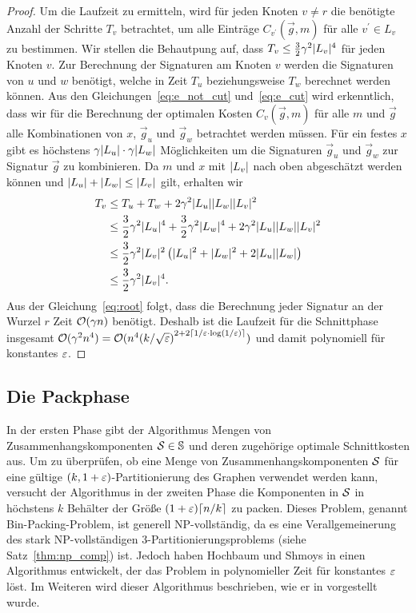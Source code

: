 \begin{proof}
    Um die Laufzeit zu ermitteln, wird für jeden Knoten $v \neq r$ die benötigte Anzahl der Schritte $T_v$ betrachtet, um alle Einträge $C_{v^\prime}(\vec{g}, m)$ für alle $v^\prime \in L_v$ zu bestimmen. 
    Wir stellen die Behautpung auf, dass $T_v \leq \frac{3}{2} \gamma^2 \lvert L_v\rvert^4$ für jeden Knoten $v$.
    Zur Berechnung der Signaturen am Knoten $v$ werden die Signaturen von $u$ und $w$ benötigt, welche in Zeit $T_u$ beziehungsweise $T_w$ berechnet werden können.
    Aus den Gleichungen~\eqref{eq:e_not_cut} und~\eqref{eq:e_cut} wird erkenntlich, dass wir für die Berechnung der optimalen Kosten $C_v(\vec{g}, m)$ für alle $m$ und $\vec{g}$ alle Kombinationen von $x$, $\vec{g}_u$ und $\vec{g}_w$ betrachtet werden müssen.
    Für ein festes $x$ gibt es höchstens $\gamma \lvert L_u\rvert \cdot \gamma \lvert L_w\rvert$ Möglichkeiten um die Signaturen $\vec{g}_u$ und $\vec{g}_w$ zur Signatur $\vec{g}$ zu kombinieren.
    Da $m$ und $x$ mit $\lvert L_v\rvert$ nach oben abgeschätzt werden können und $\lvert L_u\rvert + \lvert L_w\rvert \leq \lvert L_v\rvert$ gilt, erhalten wir
    \begin{equation*}
        \begin{aligned}
            T_v & \leq T_u + T_w + 2\gamma^2 \lvert L_u\rvert \lvert L_w\rvert \lvert L_v\rvert^2 \\
                & \leq \frac{3}{2} \gamma^2 \lvert L_u\rvert^4 + \frac{3}{2} \gamma^2 \lvert L_w\rvert^4 + 2\gamma^2 \lvert L_u\rvert \lvert L_w\rvert \lvert L_v\rvert^2 \\
                & \leq \frac{3}{2} \gamma^2 \lvert L_v\rvert^2 \left(\lvert L_u\rvert^2 + \lvert L_w\rvert^2 + 2 \lvert L_u\rvert \lvert L_w\rvert \right) \\
                & \leq \frac{3}{2} \gamma^2 \lvert L_v\rvert^4.
        \end{aligned}
    \end{equation*}
    Aus der Gleichung~\eqref{eq:root} folgt, dass die Berechnung jeder Signatur an der Wurzel $r$ Zeit $\mathcal{O}(\gamma n)$ benötigt.
    Deshalb ist die Laufzeit für die Schnittphase insgesamt $\mathcal{O}(\gamma^2 n^4) = \mathcal{O}(n^4{(k/\sqrt{\varepsilon})}^{2+2 \lceil1/\varepsilon \cdot \log(1/\varepsilon)\rceil})$ und damit polynomiell für konstantes $\varepsilon$.
\end{proof}

\subsection{Die Packphase}
In der ersten Phase gibt der Algorithmus Mengen von Zusammenhangskomponenten $\mathcal{S} \in \mathbb{S}$ und deren zugehörige optimale Schnittkosten aus.
Um zu überprüfen, ob eine Menge von Zusammenhangskomponenten $\mathcal{S}$ für eine gültige $(k,1+\varepsilon)$\hyp Partitionierung des Graphen verwendet werden kann, versucht der Algorithmus in der zweiten Phase die Komponenten in $\mathcal{S}$ in höchstens $k$ Behälter der Größe $(1 + \eps) \ceil*{n/k}$ zu packen.
Dieses Problem, genannt Bin-Packing-Problem, ist generell NP-vollständig, da es eine Verallgemeinerung des stark NP-vollständigen 3\hyp Partitionierungsproblems (siehe Satz~\ref{thm:np_comp}) ist.
Jedoch haben Hochbaum und Shmoys in \parencite{hs86} einen Algorithmus entwickelt, der das Problem in polynomieller Zeit für konstantes $\varepsilon$ löst.
Im Weiteren wird dieser Algorithmus beschrieben, wie er in \parencite{hs86, va13} vorgestellt wurde.

